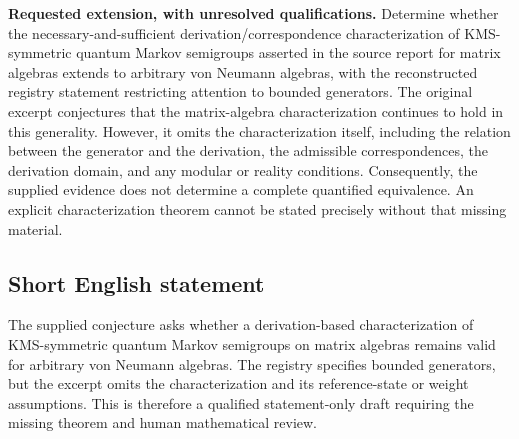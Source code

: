 \documentclass[11pt]{article}
\begin{document}
\textbf{Requested extension, with unresolved qualifications.} Determine whether the necessary-and-sufficient derivation/correspondence characterization of KMS-symmetric quantum Markov semigroups asserted in the source report for matrix algebras extends to arbitrary von Neumann algebras, with the reconstructed registry statement restricting attention to bounded generators. The original excerpt conjectures that the matrix-algebra characterization continues to hold in this generality. However, it omits the characterization itself, including the relation between the generator and the derivation, the admissible correspondences, the derivation domain, and any modular or reality conditions. Consequently, the supplied evidence does not determine a complete quantified equivalence. An explicit characterization theorem cannot be stated precisely without that missing material.
\subsection{Short English statement}
The supplied conjecture asks whether a derivation-based characterization of KMS-symmetric quantum Markov semigroups on matrix algebras remains valid for arbitrary von Neumann algebras. The registry specifies bounded generators, but the excerpt omits the characterization and its reference-state or weight assumptions. This is therefore a qualified statement-only draft requiring the missing theorem and human mathematical review.
\end{document}
